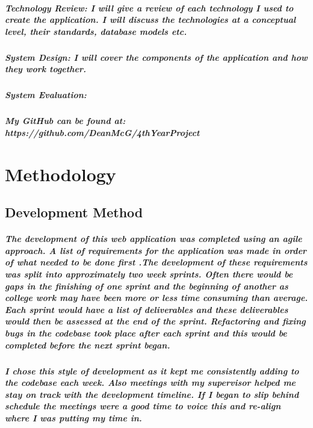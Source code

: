 \paragraph{Technology Review: I will give a review of each technology I used to create the application. I will discuss the technologies at a conceptual level, their standards, database models etc.}

\paragraph{System Design: I will cover the components of the application and how they work together.}

\paragraph{System Evaluation: }

\paragraph{My GitHub can be found at: https://github.com/DeanMcG/4thYearProject}


\chapter{Methodology}

\section{Development Method}
\paragraph{The development of this web application was completed using an agile approach. A list of requirements for the application was made in order of what needed to be done first .The development of these requirements  was split into approximately two week sprints. Often there would be gaps in the finishing of one sprint and the beginning of another as college work may have been more or less time consuming than average. Each sprint would have a list of deliverables and these deliverables would then be assessed at the end of the sprint. Refactoring and fixing bugs in the codebase took place after each sprint and this would be completed before the next sprint began.}

\paragraph{I chose this style of development as it kept me consistently adding to the codebase each week. Also meetings with my supervisor helped me stay on track with the development timeline. If I began to slip behind schedule the meetings were a good time to voice this and re-align where I was putting my time in. }

